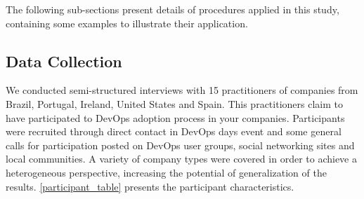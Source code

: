 The following sub-sections present details of procedures applied in this study,
containing some examples to illustrate their application.

\subsection{Data Collection}
We conducted semi-structured interviews with 15 practitioners of companies from
Brazil, Portugal, Ireland, United States and Spain. This practitioners claim
to have participated to DevOps adoption process in your companies. Participants
were recruited through direct contact in DevOps days event and some general
calls for participation posted on DevOps user groups, social networking sites
and local communities. A variety of company types were covered in order to
achieve a heterogeneous perspective, increasing the potential of generalization
of the results. \ref{participant_table} presents the participant
characteristics.


